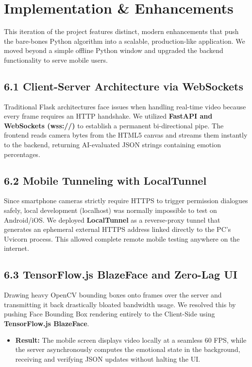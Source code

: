 \documentclass[12pt,a4paper]{report}
\begin{document}
\clearpage


\chapter{Implementation \& Enhancements}

This iteration of the project features distinct, modern enhancements that push the bare-bones Python algorithm into a scalable, production-like application. We moved beyond a simple offline Python window and upgraded the backend functionality to serve mobile users. 

\section*{6.1 Client-Server Architecture via WebSockets}
Traditional Flask architectures face issues when handling real-time video because every frame requires an HTTP handshake. We utilized \textbf{FastAPI and WebSockets (wss://)} to establish a permanent bi-directional pipe. The frontend reads camera bytes from the HTML5 canvas and streams them instantly to the backend, returning AI-evaluated JSON strings containing emotion percentages.

\section*{6.2 Mobile Tunneling with LocalTunnel}
Since smartphone cameras strictly require HTTPS to trigger permission dialogues safely, local development (localhost) was normally impossible to test on Android/iOS. We deployed \textbf{LocalTunnel} as a reverse-proxy tunnel that generates an ephemeral external HTTPS address linked directly to the PC's Uvicorn process. This allowed complete remote mobile testing anywhere on the internet.

\section*{6.3 TensorFlow.js BlazeFace and Zero-Lag UI}
Drawing heavy OpenCV bounding boxes onto frames over the server and transmitting it back drastically bloated bandwidth usage. We resolved this by pushing Face Bounding Box rendering entirely to the Client-Side using \textbf{TensorFlow.js BlazeFace}.
\begin{itemize}
    \item \textbf{Result:} The mobile screen displays video locally at a seamless 60 FPS, while the server asynchronously computes the emotional state in the background, receiving and verifying JSON updates without halting the UI.
\end{itemize}
\end{document}

